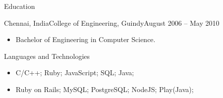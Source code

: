 \documentclass[]{mcdowellcv}
\begin{document}
	\begin{cvsection}{Education}
		\begin{cvsubsection}{Chennai, India}{College of Engineering, Guindy}{August 2006 --  May 2010}
			\begin{itemize}
				\item Bachelor of Engineering in Computer Science.
			\end{itemize}
		\end{cvsubsection}
	\end{cvsection}

	\begin{cvsection}{Languages and Technologies}
		\begin{cvsubsection}{}{}{}
			\begin{itemize}
				\item C/C++; Ruby; JavaScript; SQL; Java;
				\item Ruby on Rails; MySQL; PostgreSQL; NodeJS; Play(Java);
			\end{itemize}
		\end{cvsubsection}
	\end{cvsection}
\end{document}
